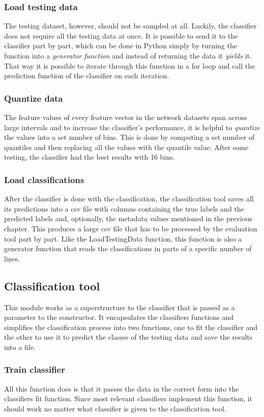 \documentclass{article}
\begin{document}
      \subsubsection{Load testing data}
        The testing dataset, however, should not be sampled at all. Luckily, the classifier does not require all the testing data at once. It is possible to send it to the classifier part by part, which can be done in Python simply by turning the function into a {\it generator function} and instead of returning the data it {\it yields} it. That way it is possible to iterate through this function in a for loop and call the prediction function of the classifier on each iteration.
      \subsubsection{Quantize data}
        The feature values of every feature vector in the network datasets span across large intervals and to increase the classifier's performance, it is helpful to {\it quantize} the values into a set number of bins. This is done by computing a set number of quantiles and then replacing all the values with the quantile value. After some testing, the classifier had the best results with 16 bins.
      \subsubsection{Load classifications}
        After the classifier is done with the classification, the classification tool saves all its predictions into a csv file with columns containing the true labels and the predicted labels and, optionally, the metadata values mentioned in the previous chapter. This produces a large csv file that has to be processed by the evaluation tool part by part. Like the LoadTestingData function, this function is also a generator function that reads the classifications in parts of a specific number of lines.
    \newpage
    \subsection{Classification tool}
      This module works as a superstructure to the classifier that is passed as a parameter to the constructor. It encapsulates the classifiers functions and simplifies the classification process into two functions, one to fit the classifier and the other to use it to predict the classes of the testing data and save the results into a file.
      \subsubsection{Train classifier}
        All this function does is that it passes the data in the correct form into the classifiers fit function. Since most relevant classifiers implement this function, it should work no matter what classifier is given to the classification tool.
\end{document}
